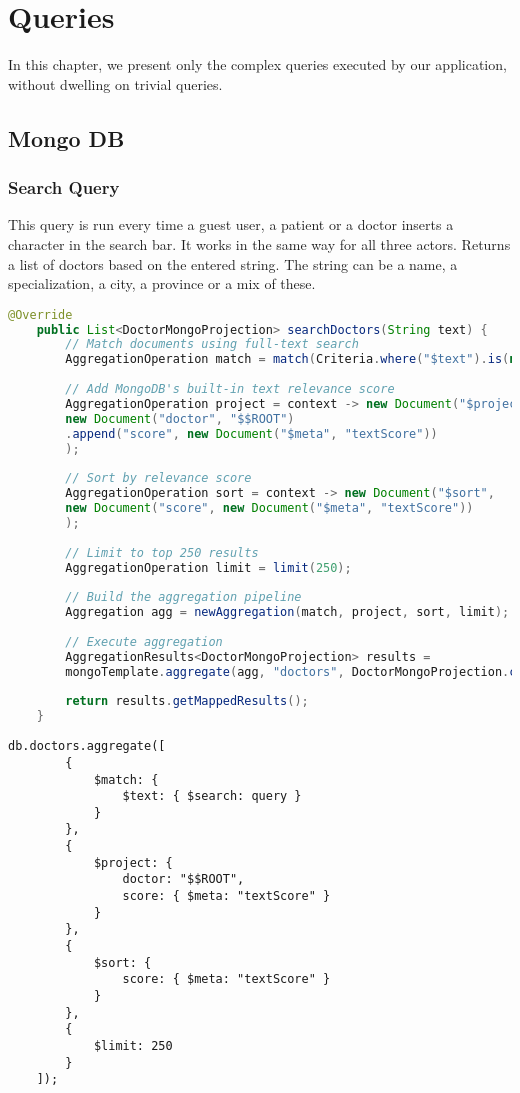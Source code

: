 \chapter{Queries}
In this chapter, we present only the complex queries executed by our application, without dwelling on trivial queries. 

\section{Mongo DB}
\subsection{Search Query}
This query is run every time a guest user, a patient or a doctor inserts a character in the search bar. It works in the same way for all three actors. Returns a list of doctors based on the entered string. The string can be a name, a specialization, a city, a province or a mix of these. 

\begin{lstlisting}[language=java, caption={Java code for the MongoDB Search Query}]
	@Override
	public List<DoctorMongoProjection> searchDoctors(String text) {
		// Match documents using full-text search
		AggregationOperation match = match(Criteria.where("$text").is(new Document("$search", text)));
		
		// Add MongoDB's built-in text relevance score
		AggregationOperation project = context -> new Document("$project",
		new Document("doctor", "$$ROOT")
		.append("score", new Document("$meta", "textScore"))
		);
		
		// Sort by relevance score
		AggregationOperation sort = context -> new Document("$sort",
		new Document("score", new Document("$meta", "textScore"))
		);
		
		// Limit to top 250 results
		AggregationOperation limit = limit(250);
		
		// Build the aggregation pipeline
		Aggregation agg = newAggregation(match, project, sort, limit);
		
		// Execute aggregation
		AggregationResults<DoctorMongoProjection> results =
		mongoTemplate.aggregate(agg, "doctors", DoctorMongoProjection.class);
		
		return results.getMappedResults();
	}
\end{lstlisting}

\begin{lstlisting}[language=mongodb, caption={Equivalent MongoDB Aggregation Pipeline for the Search Query}]
	db.doctors.aggregate([
		{
			$match: {
				$text: { $search: query }
			}
		},
		{
			$project: {
				doctor: "$$ROOT",
				score: { $meta: "textScore" }
			}
		},
		{
			$sort: {
				score: { $meta: "textScore" }
			}
		},
		{
			$limit: 250
		}
	]);
\end{lstlisting}

